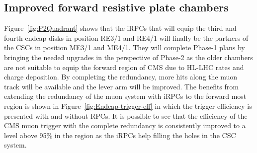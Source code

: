 	\subsection{Improved forward resistive plate chambers}
	\label{chapt3:ssec:iRPCs}
	
	Figure~\ref{fig:P2Quadrant} shows that the iRPCs that will equip the third and fourth endcap disks in position RE3/1 and RE4/1 will finally be the partners of the CSCs in position ME3/1 and ME4/1. They will complete Phase-1 plans by bringing the needed upgrades in the perspective of Phase-2 as the older chambers are not suitable to equip the forward region of CMS due to HL-LHC rates and charge deposition. By completing the redundancy, more hits along the muon track will be available and the lever arm will be improved. The benefits from extending the redundancy of the muon system with iRPCs to the forward most region is shown in Figure~\ref{fig:Endcap-trigger-eff} in which the trigger efficiency is presented with and without RPCs. It is possible to see that the efficiency of the CMS muon trigger with the complete redundancy is consistently improved to a level above 95\% in the region  as the iRPCs help filling the holes in the CSC system.

